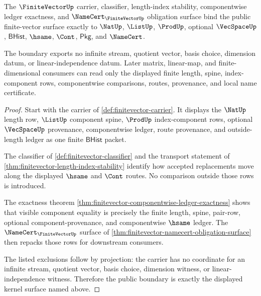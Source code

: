 \begin{theorem}
\label{thm:finitevector-scoped-kernel-boundary}
The $\FiniteVectorUp$ carrier, classifier, length-index stability,
componentwise ledger exactness, and $\NameCert_{\FiniteVectorUp}$ obligation
surface bind the public finite-vector surface exactly to $\NatUp$, $\ListUp$,
$\ProdUp$, optional $\VecSpaceUp$, $\mathsf{BHist}$, $\hsame$, $\Cont$,
$\mathsf{Pkg}$, and $\NameCert$.

The boundary exports no infinite stream, quotient vector, basis choice,
dimension datum, or linear-independence datum. Later matrix, linear-map, and
finite-dimensional consumers can read only the displayed finite length, spine,
index-component rows, componentwise comparisons, routes, provenance, and local
name certificate.
\end{theorem}
\begin{proof}
Start with the carrier of \autoref{def:finitevector-carrier}. It displays the
$\NatUp$ length row, $\ListUp$ component spine, $\ProdUp$ index-component
rows, optional $\VecSpaceUp$ provenance, componentwise ledger, route
provenance, and outside-length ledger as one finite $\mathsf{BHist}$ packet.

The classifier of \autoref{def:finitevector-classifier} and the transport
statement of \autoref{thm:finitevector-length-index-stability} identify how
accepted replacements move along the displayed $\hsame$ and $\Cont$ routes.
No comparison outside those rows is introduced.

The exactness theorem
\autoref{thm:finitevector-componentwise-ledger-exactness} shows that visible
component equality is precisely the finite length, spine, pair-row, optional
component-provenance, and componentwise $\hsame$ ledger. The
$\NameCert_{\FiniteVectorUp}$ surface of
\autoref{thm:finitevector-namecert-obligation-surface} then repacks those
rows for downstream consumers.

The listed exclusions follow by projection: the carrier has no coordinate for
an infinite stream, quotient vector, basis choice, dimension witness, or
linear-independence witness. Therefore the public boundary is exactly the
displayed kernel surface named above.
\end{proof}

